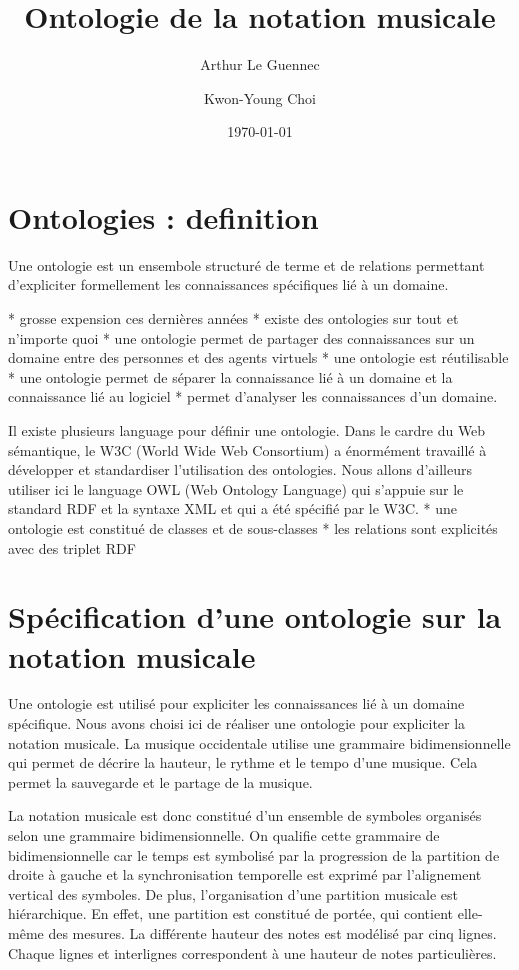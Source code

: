 \documentclass[a4paper]{article}
\title{Ontologie de la notation musicale}
\author{Arthur Le Guennec \and Kwon-Young Choi}
\date{\normalsize\today}
\begin{document}
\maketitle

\section{Ontologies : definition}

Une ontologie est un ensembole structuré de terme et de relations permettant d'expliciter formellement les connaissances spécifiques lié à un domaine.

* grosse expension ces dernières années
* existe des ontologies sur tout et n'importe quoi
* une ontologie permet de partager des connaissances sur un domaine entre des personnes et des agents virtuels
* une ontologie est réutilisable
* une ontologie permet de séparer la connaissance lié à un domaine et la connaissance lié au logiciel
* permet d'analyser les connaissances d'un domaine.

Il existe plusieurs language pour définir une ontologie.
Dans le cardre du Web sémantique, le W3C (World Wide Web Consortium) a énormément travaillé à développer et standardiser l'utilisation des ontologies.
Nous allons d'ailleurs utiliser ici le language OWL (Web Ontology Language) qui s'appuie sur le standard RDF et la syntaxe XML et qui a été spécifié par le W3C.
* une ontologie est constitué de classes et de sous-classes
* les relations sont explicités avec des triplet RDF

\section{Spécification d'une ontologie sur la notation musicale}

Une ontologie est utilisé pour expliciter les connaissances lié à un domaine spécifique.
Nous avons choisi ici de réaliser une ontologie pour expliciter la notation musicale.
La musique occidentale utilise une grammaire bidimensionnelle qui permet de décrire la hauteur, le rythme et le tempo d'une musique.
Cela permet la sauvegarde et le partage de la musique.

La notation musicale est donc constitué d'un ensemble de symboles organisés selon une grammaire bidimensionnelle.
On qualifie cette grammaire de bidimensionnelle car le temps est symbolisé par la progression de la partition de droite à gauche et la synchronisation temporelle est exprimé par l'alignement vertical des symboles.
De plus, l'organisation d'une partition musicale est hiérarchique.
En effet, une partition est constitué de portée, qui contient elle-même des mesures.
La différente hauteur des notes est modélisé par cinq lignes.
Chaque lignes et interlignes correspondent à une hauteur de notes particulières.
\end{document}
